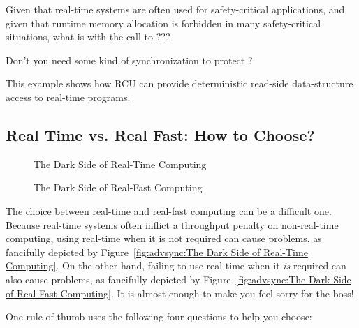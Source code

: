 \QuickQuiz{}
	Given that real-time systems are often used for safety-critical
	applications, and given that runtime memory allocation is
	forbidden in many safety-critical situations, what is with
	the call to ???
 \QuickQuizEnd

\QuickQuiz{}
	Don't you need some kind of synchronization to protect
	?
 \QuickQuizEnd

This example shows how RCU can provide deterministic read-side
data-structure access to real-time programs.

\subsection{Real Time vs. Real Fast: How to Choose?}
\label{sec:advsync:Real Time vs. Real Fast: How to Choose?}

\begin{figure}[tb]
\centering
{}
\caption{The Dark Side of Real-Time Computing}
\end{figure}

\begin{figure}[tb]
\centering
{}
\caption{The Dark Side of Real-Fast Computing}
\end{figure}

The choice between real-time and real-fast computing can be a difficult one.
Because real-time systems often inflict a throughput penalty on non-real-time
computing, using real-time when it is not required can cause problems,
as fancifully depicted by
Figure~\ref{fig:advsync:The Dark Side of Real-Time Computing}.
On the other hand, failing to use real-time when it \emph{is} required
can also cause problems, as fancifully depicted by
Figure~\ref{fig:advsync:The Dark Side of Real-Fast Computing}.
It is almost enough to make you feel sorry for the boss!

One rule of thumb uses the following four questions to help you choose:

